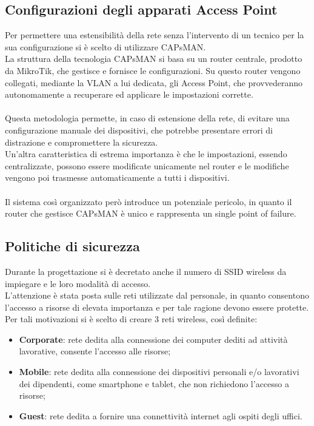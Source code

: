 \documentclass[Realizzazione.tex]{subfiles}
\begin{document}
\subsection{Configurazioni degli apparati Access Point}
Per permettere una estensibilità della rete senza l'intervento di un tecnico per la sua configurazione si è scelto di utilizzare CAPsMAN. \\
La struttura della tecnologia CAPsMAN si basa su un router centrale, prodotto da MikroTik, che gestisce e fornisce le configurazioni. Su questo router vengono collegati, mediante la VLAN a lui dedicata, gli Access Point, che provvederanno autonomamente a recuperare ed applicare le impostazioni corrette. \\\\
Questa metodologia permette, in caso di estensione della rete, di evitare una configurazione manuale dei dispositivi, che potrebbe presentare errori di distrazione e compromettere la sicurezza. \\
Un'altra caratteristica di estrema importanza è che le impostazioni, essendo centralizzate, possono essere modificate unicamente nel router e le modifiche vengono poi trasmesse automaticamente a tutti i dispositivi. \\\\
Il sistema così organizzato però introduce un potenziale pericolo, in quanto il router che gestisce CAPsMAN è unico e rappresenta un single point of failure.

\newpage
\subsection{Politiche di sicurezza}
Durante la progettazione si è decretato anche il numero di SSID wireless da impiegare e le loro modalità di accesso. \\
L'attenzione è stata posta sulle reti utilizzate dal personale, in quanto consentono l'accesso a risorse di elevata importanza e per tale ragione devono essere protette. \\
Per tali motivazioni si è scelto di creare 3 reti wireless, così definite:
\begin{itemize}
	\item \textbf{Corporate}: rete dedita alla connessione dei computer dediti ad attività lavorative, consente l'accesso alle risorse;
	\item \textbf{Mobile}: rete dedita alla connessione dei dispositivi personali e/o lavorativi dei dipendenti, come smartphone e tablet, che non richiedono l'accesso a risorse;
	\item \textbf{Guest}: rete dedita a fornire una connettività internet agli ospiti degli uffici.
\end{itemize}
\end{document}
